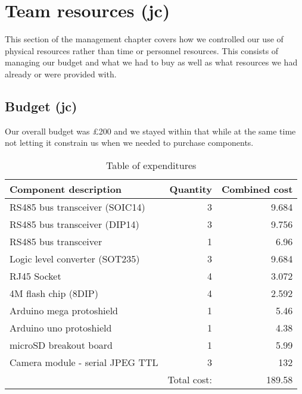 
\section{Team resources (jc)}
\label{sec:team_resources}

This section of the management chapter covers how we controlled our use of physical resources rather than time or personnel resources. This consists of managing our budget and what we had to buy as well as what resources we had already or were provided with.

\subsection{Budget (jc)}

Our overall budget was \pounds 200 and we stayed within that while at the same time not letting it constrain us when we needed to purchase components.

\begin{table}[H]
\begin{tabular}{| l | r || r |}
\hline
\textbf{Component description} & \textbf{Quantity} & \textbf{Combined cost} \\ \hline \hline
RS485 bus transceiver (SOIC14) & 3 & 9.684 \\ \hline
RS485 bus transceiver (DIP14) & 3 & 9.756 \\ \hline
RS485 bus transceiver & 1 & 6.96 \\ \hline
Logic level converter (SOT235) & 3 & 9.684 \\ \hline
RJ45 Socket & 4 & 3.072 \\ \hline
4M flash chip (8DIP) & 4 & 2.592 \\ \hline
Arduino mega protoshield & 1 & 5.46 \\ \hline
Arduino uno protoshield & 1 & 4.38 \\ \hline
microSD breakout board & 1 & 5.99 \\ \hline
Camera module - serial JPEG TTL & 3 & 132 \\ \hline \hline
 & Total cost: & 189.58 \\ \hline
\end{tabular}
\caption{Table of expenditures}
\label{expenditure}
\end{table}


